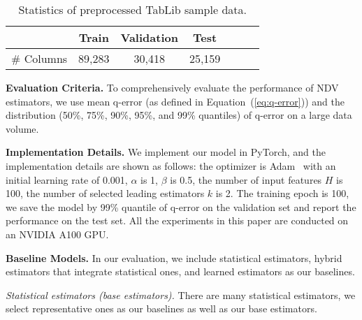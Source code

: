\begin{table}[]
    \centering
    \caption{Statistics of preprocessed TabLib sample data.}
    \begin{tabular}{ccccccc}
\toprule
        &  Train & Validation & Test     \\
\midrule
         \# Columns  & 89,283 & 30,418 & 25,159  \\

\bottomrule
    \end{tabular}
    \label{tab:data-statistics}
\end{table}



\noindent\textbf{Evaluation Criteria.} To comprehensively evaluate the performance of NDV estimators, we use mean q-error (as defined in Equation~(\ref{eq:q-error})) and the distribution (50\%, 75\%, 90\%, 95\%, and 99\% quantiles) of q-error on a large data volume.



\noindent\textbf{Implementation Details.} We implement our model in PyTorch, and the implementation details are shown as follows: 
the optimizer is Adam~\cite{adam_kingma2014adam} with an initial learning rate of 0.001, $\alpha$ is 1, $\beta$ is 0.5, the number of input features $H$ is 100, the number of selected leading estimators $k$ is 2. The training epoch is 100, we save the model by 99\% quantile of q-error on the validation set and report the performance on the test set. All the experiments in this paper are conducted on an NVIDIA A100 GPU.


\noindent\textbf{Baseline Models.} 
In our evaluation, we include statistical estimators, hybrid estimators that integrate statistical ones, and learned estimators as our baselines.


\noindent\textit{Statistical estimators (base estimators).}
There are many statistical estimators, we select representative ones as our baselines as well as our base estimators.


